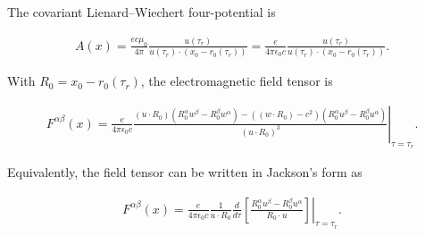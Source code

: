 The covariant Lienard--Wiechert four-potential is
\begin{highlightbox}[title={Lienard--Wiechert four-potential}]
    \begin{align}
        A(x)=\frac{ec\mu_0}{4\pi}\frac{u(\tau_r)}{u(\tau_r)\cdot(x_0-r_0(\tau_r))}
        =\frac{e}{4\pi\epsilon_0c}\frac{u(\tau_r)}{u(\tau_r)\cdot(x_0-r_0(\tau_r))}.
    \end{align}
\end{highlightbox}

With $R_0=x_0-r_0(\tau_r)$, the electromagnetic field tensor is
\begin{highlightbox}[title={Covariant Faraday tensor}]
    \begin{align}
        F^{\alpha\beta}(x)
        =\left.\frac{e}{4\pi\epsilon_0c}
        \frac{(u\cdot R_0)(R_0^{\alpha}w^{\beta}-R_0^{\beta}w^{\alpha})
            -((w\cdot R_0)-c^2)(R_0^{\alpha}u^{\beta}-R_0^{\beta}u^{\alpha})}
        {(u\cdot R_0)^3}\right|_{\tau=\tau_r}.\label{eq:F_alpha_beta_primary_form}
    \end{align}
\end{highlightbox}

Equivalently, the field tensor can be written in Jackson's form as
\begin{highlightbox}[title={Faraday tensor in Jackson's form}]
    \begin{align}\label{JacksonF}
        F^{\alpha\beta}(x)
        =\left.\frac{e}{4\pi\epsilon_0c}\frac1{u\cdot R_0}
        \frac{d}{d\tau}\left[
            \frac{R_0^{\alpha}u^{\beta}-R_0^{\beta}u^{\alpha}}{R_0\cdot u}
            \right]\right|_{\tau=\tau_r}.
    \end{align}
\end{highlightbox}

